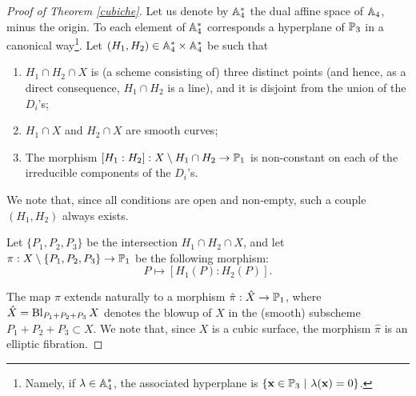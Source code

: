 \documentclass[a4paper,12pt]{article}
\begin{document}
\begin{proof}[Proof of Theorem \ref{cubiche}]
	Let us denote by $\A_4^*$ the dual affine space of $\A_4$, minus the origin. To each element of $\A_4^*$ corresponds a hyperplane of $\P_3$ in a canonical way\footnote{Namely, if $\lambda \in \A_4^*$, the associated hyperplane is $\{\mathbf{x} \in \P_3 \ | \ \lambda(\mathbf{x})=0\}$.}. Let $(H_1,H_2) \in \A_4^* \times \A_4^*$ be such that 
	\begin{enumerate}
		\item $H_1 \cap H_2 \cap X$ is (a scheme consisting of) three distinct points (and hence, as a direct consequence, $H_1 \cap H_2$ is a line), and it is disjoint from the union of the $D_i$'s;
		\item $H_1 \cap X$ and $H_2 \cap X$ are smooth curves;
		\item The morphism $[H_1:H_2]:X \setminus H_1 \cap H_2 \rightarrow \P_1$ is non-constant on each of the irreducible components of the $D_i$'s.
	\end{enumerate}
	We note that, since all conditions are open and non-empty, such a couple $(H_1,H_2)$ always exists.
%	

	Let $\{P_1,P_2,P_3\}$ be the intersection $H_1 \cap H_2 \cap X$, and let $\pi:  X \setminus \{P_1,P_2,P_3\}  \rightarrow \P_1$ be the following morphism:
	\begin{equation*}
		P \longmapsto [H_1(P):H_2(P)].
	\end{equation*}

	The map $\pi$ extends naturally to a morphism $\hat{\pi}:\hat{X} \rightarrow \P_1$, where $\hat{X}=\Blowup_{P_1+P_2+P_3}X$ denotes the blowup of $X$ in the (smooth) subscheme $P_1+P_2+P_3 \subset X$. We note that, since $X$ is a cubic surface, the morphism $\hat{\pi}$ is an elliptic fibration. 
	

\end{proof}
\end{document}
